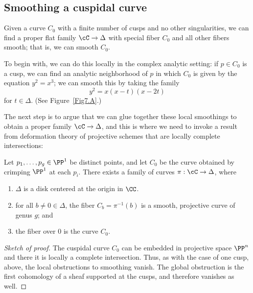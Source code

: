 \subsection*{Smoothing a cuspidal curve}
Given a curve $C_0$ with a finite number of cusps and no other
singularities, we can find a proper flat family $\cC \to \Delta$ with
special fiber $C_0$ and all other fibers smooth;
that is, we can smooth $C_0$.

To begin with, we can do this locally in the complex analytic setting:
if $p \in C_0$ is a cusp, we can find an analytic neighborhood of $p$
in which $C_0$ is given by the equation $y^2 = x^3$; we can smooth this
by taking the family
$$
y^2 = x(x-t)(x-2t)
$$
for $t\in \Delta$.
(See Figure~\ref{Fig7.A}.)

The next step is to argue that we can glue together these local
smoothings
%
to obtain a proper family $\cC \to \Delta$, and this is where we need
to invoke a result from
deformation theory
%
of projective schemes that
are
%
locally complete intersections:

\begin{npt}
\begin{lemma}[{{\cite[Proposition 6.5.2]{MR2223408}}}]
\label{specialization to cuspidal curve}
Let
$p_1,\dots,p_g\in \PP^{1}$ be distinct points,
and let $C_0$ be
the curve
obtained by
crimping $\PP^1$ at each $p_i$. There exists a family of curves $\pi :
\cC \to \Delta$, where
\begin{enumerate}
\item $\Delta$ is a disk centered at the origin in $\CC$.
\item for all $b \neq 0 \in \Delta$, the fiber $C_b = \pi^{-1}(b)$
is a smooth, projective curve of genus $g$;  and
\item the fiber over $0$ is the curve $C_0$.
\unif
\end{enumerate}
\end{lemma}
\end{npt}

\begin{proof}[Sketch of proof]
The cuspidal curve $C_{0}$ can be embedded in projective space $\PP^{n}$
and there
it is locally a complete intersection.
Thus,
as with the case of one cusp,
above, the local obstructions
to smoothing vanish. The global obstruction is the first cohomology of
a sheaf supported at the cusps,
and therefore vanishes as well.
\end{proof}

